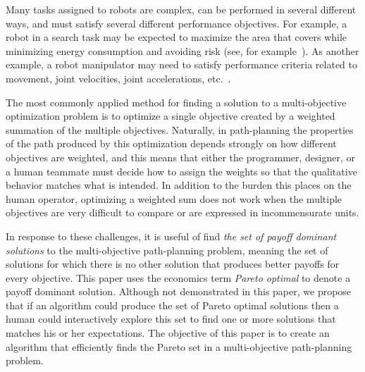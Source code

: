 \documentclass{article}
\begin{document}

Many tasks assigned to robots are complex, can be performed in several different ways, and must satisfy several different performance objectives.  
For example, a robot in a search task may be expected to maximize the area that covers while minimizing energy consumption and avoiding risk (see, for example~\cite{yi2014supporting,mei2005deployment}). 
As another example, a robot manipulator may need to satisfy performance criteria  related to movement, joint velocities, joint accelerations, etc.~\cite{Pires2004}.


The most commonly applied method for finding a solution to a multi-objective optimization problem is to optimize a single objective created by a weighted summation of the multiple objectives.  
Naturally, in path-planning the properties of the path produced by this optimization depends strongly on how different objectives are weighted, and this means that either the programmer, designer, or a human teammate must decide how to assign the weights so that the qualitative behavior matches what is intended.  
In addition to the burden this places on the human operator, optimizing a weighted sum does not work when the multiple objectives are very difficult to compare or are expressed in incommensurate units.

In response to these challenges, it is useful of find {\em the set of payoff dominant solutions} to the multi-objective path-planning problem, meaning the set of solutions for which there is no other solution that produces better payoffs for every objective.   
This paper uses the economics term {\em Pareto optimal} to denote a payoff dominant solution.  Although not demonstrated in this paper, we propose that if an algorithm could produce the set of Pareto optimal solutions then a human could interactively explore this set to find one or more solutions that matches his or her expectations. 
The objective of this paper is to create an algorithm that efficiently finds the Pareto set in a multi-objective path-planning problem.
\end{document}
